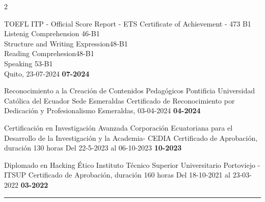 \begin{paracol}{2}
\begin{rightcolumn} 

\begin{dport}
	\pvevent
	{TOEFL ITP - Official Score Report - ETS}
	{Certificate of Achievement - 473 B1}
	{Listenig Comprehension \hspace{1.88cm}46-B1\\
	Structure and Writing Expression\hspace{0.5cm}48-B1\\
	Reading Comprehesion\hspace{2.2cm}48-B1\\
	Speaking \hspace{4.2cm}53-B1\\}
	{Quito, 23-07-2024}
	{\textbf{07-2024}}
\end{dport}

\begin{dport}
	\pvevent
	{Reconocimiento a la Creación de Contenidos Pedagógicos}
	{Pontificia Universidad Católica del Ecuador Sede Esmeraldas}
	{Certificado de Reconocimiento por Dedicación y Profesionalismo}
	{Esmeraldas, 03-04-2024}
	{\textbf{04-2024}}
\end{dport}

\begin{lport}
	\pvevent
	{Certificación en Investigación Avanzada}
	{Corporación Ecuatoriana para el Desarrollo de la Investigación y la Academia-
	CEDIA}
	{Certificado de Aprobación, duración 130 horas}
	{Del 22-5-2023 al 06-10-2023}
	{\textbf{10-2023}}
\end{lport}





\begin{lport}
	\pvevent
	{Diplomado en Hacking Ético}
	{Instituto Técnico Superior Universitario Portoviejo - ITSUP}
	{Certificado de Aprobación, duración 160 horas}
	{Del 18-10-2021 al 23-03-2022}
	{\textbf{03-2022}}
	
\end{lport}



\end{rightcolumn}
\end{paracol}
\setlength{\parindent}{0pt}
\textcolor{lightcol}{ \rule{1.02\textwidth}{3pt} }


